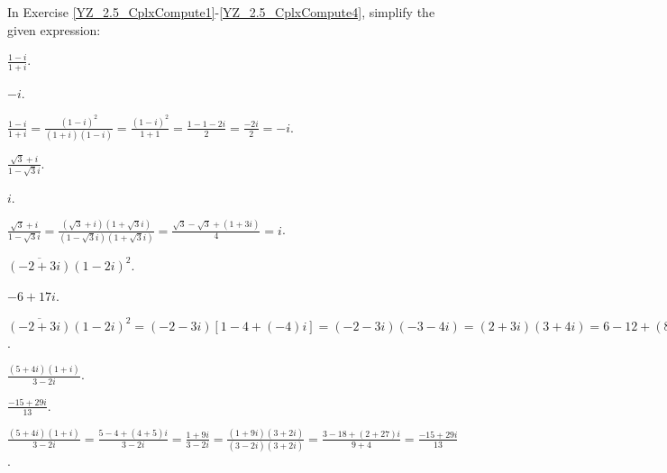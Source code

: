 \documentclass{ximera}
\begin{document}
In Exercise \ref{YZ_2.5_CplxCompute1}-\ref{YZ_2.5_CplxCompute4}, simplify the given expression:

\begin{exercise} \label{YZ_2.5_CplxCompute1}
$\frac{1-i}{1+i}$.

\begin{solution}
\ans $-i$.

\soln $\frac{1-i}{1+i}=\frac{(1-i)^2}{(1+i)(1-i)}=\frac{(1-i)^2}{1+1}=\frac{1-1-2i}{2}=\frac{-2i}{2}=-i$.
\end{solution}
\end{exercise}


\begin{exercise}\label{YZ_2.5_CplxCompute2}
$\frac{\sqrt{3}+i}{1-\sqrt{3}i}$.

\begin{solution}
\ans $i$.

\soln $\frac{\sqrt{3}+i}{1-\sqrt{3}i}=\frac{(\sqrt{3}+i)(1+\sqrt{3}i)}{(1-\sqrt{3}i)(1+\sqrt{3}i)}=\frac{\sqrt{3}-\sqrt{3}+(1+3i)}{4}=i$.
\end{solution}
\end{exercise}

\begin{exercise}\label{YZ_2.5_CplxCompute3}
$\overline{(-2+3i)}(1-2i)^2$.

\begin{solution}
\ans $-6+17i$.

\soln $\overline{(-2+3i)}(1-2i)^2=(-2-3i)[1-4+(-4)i]=(-2-3i)(-3-4i)=(2+3i)(3+4i)=6-12+(8+9)i=-6+17i$.
\end{solution}
\end{exercise}

\begin{exercise}\label{YZ_2.5_CplxCompute4}
$\frac{(5+4i)(1+i)}{3-2i}$.

\begin{solution}
\ans $\frac{-15+29i}{13}$.

\soln $\frac{(5+4i)(1+i)}{3-2i}=\frac{5-4+(4+5)i}{3-2i}=\frac{1+9i}{3-2i}=\frac{(1+9i)(3+2i)}{(3-2i)(3+2i)}=\frac{3-18+(2+27)i}{9+4}=\frac{-15+29i}{13}$.
\end{solution}
\end{exercise}
\end{document}
